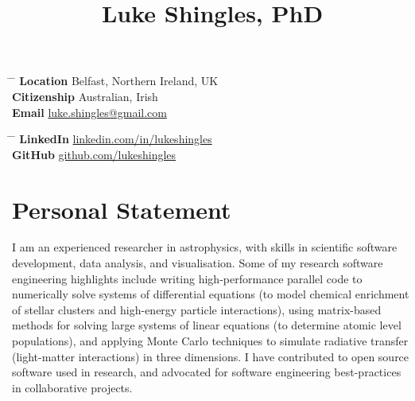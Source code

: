 \documentclass[11pt]{article} %
\begin{document}

\title{Luke Shingles, PhD} %


\parbox{0.5\textwidth}{ %
\begin{tabbing} %
\hspace{2.3cm} \= \hspace{4cm} \= \kill %
{\bf Location} \> Belfast, Northern Ireland, UK\\
{\bf Citizenship} \> Australian, Irish\\
{\bf Email} \> \href{mailto:luke.shingles@gmail.com}{luke.shingles@gmail.com}
\end{tabbing}}
\hfill %
\parbox{0.5\textwidth}{ %
\begin{tabbing} %
\hspace{2.3cm} \= \hspace{4cm} \= \kill %
{\bf LinkedIn} \> \href{https://www.linkedin.com/in/lukeshingles}{linkedin.com/in/lukeshingles}\\
{\bf GitHub} \> \href{https://github.com/lukeshingles}{github.com/lukeshingles}\\
\end{tabbing}}

\section{Personal Statement}
I am an experienced researcher in astrophysics, with skills in scientific software development, data analysis, and visualisation. Some of my research software engineering highlights include writing high-performance parallel code to numerically solve systems of differential equations (to model chemical enrichment of stellar clusters and high-energy particle interactions), using matrix-based methods for solving large systems of linear equations (to determine atomic level populations), and applying Monte Carlo techniques to simulate radiative transfer (light-matter interactions) in three dimensions. I have contributed to open source software used in research, and advocated for software engineering best-practices in collaborative projects.\\
\end{document}
